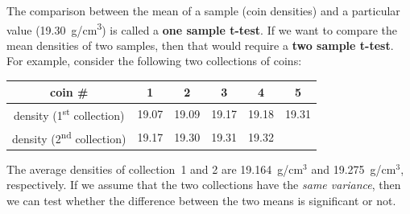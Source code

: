 The comparison between the mean of a sample (coin densities) and a
particular value (19.30~g/cm\textsuperscript{3}) is called a
\textbf{one sample t-test}. If we want to compare the mean densities
of two samples, then that would require a \textbf{two sample
  t-test}. For example, consider the following two collections of
coins:

\begin{center}
\begin{tabular}{c|ccccc}
  coin \# & 1 & 2 & 3 & 4 & 5 \\ \hline
  density (1\textsuperscript{st} collection) &
  19.07 & 19.09 & 19.17 & 19.18 & 19.31 \\
  density (2\textsuperscript{nd} collection) &
  19.17 & 19.30 & 19.31 & 19.32
  \label{tab:2setcoins}
\end{tabular}
\end{center}

The average densities of collection~1 and 2 are 19.164~g/cm$^3$ and
19.275~g/cm$^3$, respectively. If we assume that the two collections
have the \textit{same variance}, then we can test whether the
difference between the two means is significant or not.

